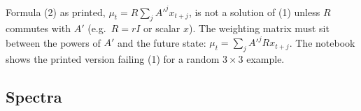 \documentclass[12pt, letterpaper]{article}
\begin{document}
\begin{tcolorbox}[trapbox]
Formula (2) as printed, $\mu_t=R\sum_jA'^jx_{t+j}$, is not a solution of (1) unless $R$ commutes with
$A'$ (e.g.\ $R=rI$ or scalar $x$). The weighting matrix must sit between the powers of $A'$ and the
future state: $\mu_t=\sum_jA'^jRx_{t+j}$. The notebook shows the printed version failing (1) for a
random $3\times3$ example.
\end{tcolorbox}

\subsection{Spectra}

\end{document}
